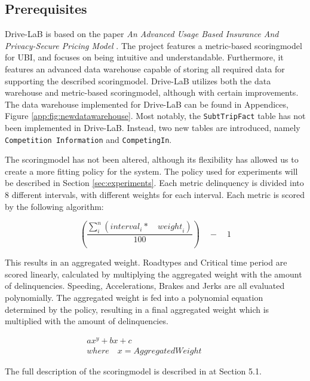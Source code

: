 \subsection{Prerequisites}\label{subsec:prereq}
Drive-LaB is based on the paper \textit{An Advanced Usage Based Insurance And Privacy-Secure Pricing Model} \citep{sw9_report}. The project features a metric-based scoringmodel for UBI, and focuses on being intuitive and understandable. Furthermore, it features an advanced data warehouse capable of storing all required data for supporting the described scoringmodel. Drive-LaB utilizes both the data warehouse and metric-based scoringmodel, although with certain improvements. The data warehouse implemented for Drive-LaB can be found in Appendices, Figure \ref{app:fig:newdatawarehouse}. Most notably, the \texttt{SubtTripFact} table has not been implemented in Drive-LaB. Instead, two new tables are introduced, namely \texttt{Competition Information} and \texttt{CompetingIn}.

The scoringmodel has not been altered, although its flexibility has allowed us to create a more fitting policy for the system. The policy used for experiments will be described in Section \ref{sec:experiments}. Each metric delinquency is divided into 8 different intervals, with different weights for each interval. Each metric is scored by the following algorithm:

$$
\left( \frac { \sum _{ i }^{ n }{ \left( { interval }_{ i }*\quad { weight }_{ i } \right)  }  }{ 100 }  \right) \quad -\quad 1
$$

This results in an aggregated weight. Roadtypes and Critical time period are scored linearly, calculated by multiplying the aggregated weight with the amount of delinquencies. Speeding, Accelerations, Brakes and Jerks are all evaluated polynomially. The aggregated weight is fed into a polynomial equation determined by the policy, resulting in a final aggregated weight which is multiplied with the amount of delinquencies.

\begin{align*}
ax^{y} + bx + c\quad \quad \quad \quad \quad \quad \quad \quad \quad \quad \quad \\
where\quad x = AggregatedWeight
\end{align*}

The full description of the scoringmodel is described in \citep{sw9_report} at Section 5.1.